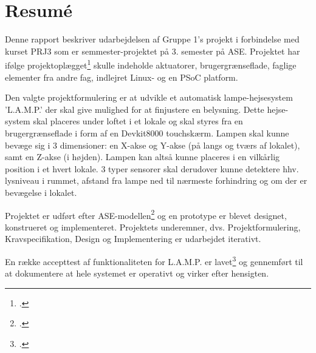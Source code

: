 \chapter*{Resumé}

Denne rapport beskriver udarbejdelsen af Gruppe 1’s projekt i forbindelse med kurset PRJ3 som er semmester-projektet på 3. semester på ASE. Projektet har ifølge projektoplægget\footcite{prj3-oplaeg} skulle indeholde aktuatorer, brugergrænseflade, faglige elementer fra andre fag, indlejret Linux- og en PSoC platform.

Den valgte projektformulering er at udvikle et automatisk lampe-hejsesystem ’L.A.M.P.’ der skal give mulighed for at finjustere en belysning. Dette hejse-system skal placeres under loftet i et lokale og skal styres fra en brugergrænseflade i form af en Devkit8000 touchskærm. Lampen skal kunne bevæge sig i 3 dimensioner: en X-akse og Y-akse (på langs og tværs af lokalet), samt en Z-akse (i højden). Lampen kan altså kunne placeres i en vilkårlig position i et hvert lokale. 3 typer sensorer skal derudover kunne detektere hhv. lysniveau i rummet, afstand fra lampe ned til nærmeste forhindring og om der er bevægelse i lokalet. 

Projektet er udført efter ASE-modellen\footcite{udviklingVejledning} og en prototype er blevet designet, konstrueret og implementeret. Projektets underemner, dvs. Projektformulering, Kravspecifikation, Design og Implementering er udarbejdet iterativt.

En række accepttest af funktionaliteten for L.A.M.P. er lavet\footcite{documentation} og gennemført til at dokumentere at hele systemet er operativt og virker efter hensigten.
